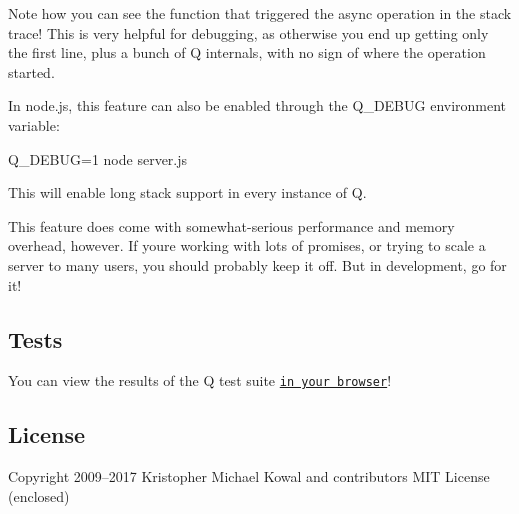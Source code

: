 Note how you can see the function that triggered the async operation in the stack trace! This is very helpful for debugging, as otherwise you end up getting only the first line, plus a bunch of Q internals, with no sign of where the operation started.

In node.\+js, this feature can also be enabled through the Q\+\_\+\+D\+E\+B\+UG environment variable\+:


\begin{DoxyCode}
Q\_DEBUG=1 node server.js
\end{DoxyCode}


This will enable long stack support in every instance of Q.

This feature does come with somewhat-\/serious performance and memory overhead, however. If you\textquotesingle{}re working with lots of promises, or trying to scale a server to many users, you should probably keep it off. But in development, go for it!

\subsection*{Tests}

You can view the results of the Q test suite \href{https://rawgithub.com/kriskowal/q/v1/spec/q-spec.html}{\tt in your browser}!

\subsection*{License}

Copyright 2009–2017 Kristopher Michael Kowal and contributors M\+IT License (enclosed) 